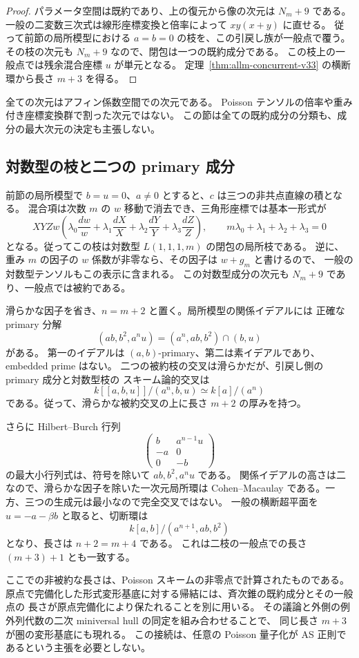 \begin{proof}
パラメータ空間は既約であり、上の復元から像の次元は $N_m+9$ である。
一般の二変数三次式は線形座標変換と倍率によって $xy(x+y)$ に直せる。
従って前節の局所模型における $a=b=0$ の枝を、この引戻し族が一般点で覆う。
その枝の次元も $N_m+9$ なので、閉包は一つの既約成分である。
この枝上の一般点では残余混合座標 $u$ が単元となる。
定理~\ref{thm:allm-concurrent-v33} の横断環から長さ $m+3$ を得る。
\end{proof}

全ての次元はアフィン係数空間での次元である。
Poisson テンソルの倍率や重み付き座標変換群で割った次元ではない。
この節は全ての既約成分の分類も、成分の最大次元の決定も主張しない。

\subsection{対数型の枝と二つの primary 成分}

前節の局所模型で $b=u=0$、$a\ne0$ とすると、$c$ は三つの非共点直線の積となる。
混合項は次数 $m$ の $w$ 移動で消去でき、三角形座標では基本一形式が
\[
 XYZ w\left(\lambda_0\frac{dw}{w}
 +\lambda_1\frac{dX}{X}
 +\lambda_2\frac{dY}{Y}
 +\lambda_3\frac{dZ}{Z}\right),
 \qquad m\lambda_0+\lambda_1+\lambda_2+\lambda_3=0
\]
となる。従ってこの枝は対数型 $L(1,1,1,m)$ の閉包の局所枝である。
逆に、重み $m$ の因子の $w$ 係数が非零なら、その因子は $w+g_m$ と書けるので、
一般の対数型テンソルもこの表示に含まれる。
この対数型成分の次元も $N_m+9$ であり、一般点では被約である。

滑らかな因子を省き、$n=m+2$ と置く。局所模型の関係イデアルには
正確な primary 分解
\[
 (ab,b^2,a^n u)=(a^n,ab,b^2)\cap(b,u)
\]
がある。
第一のイデアルは $(a,b)$-primary、第二は素イデアルであり、embedded prime はない。
二つの被約枝の交叉は滑らかだが、引戻し側の primary 成分と対数型枝の
スキーム論的交叉は
\[
 k[[a,b,u]]/(a^n,b,u)\simeq k[a]/(a^n)
\]
である。従って、滑らかな被約交叉の上に長さ $m+2$ の厚みを持つ。

さらに Hilbert--Burch 行列
\[
 \begin{pmatrix}
 b&a^{n-1}u\\
 -a&0\\
 0&-b
 \end{pmatrix}
\]
の最大小行列式は、符号を除いて $ab,b^2,a^nu$ である。
関係イデアルの高さは二なので、滑らかな因子を除いた一次元局所環は
Cohen--Macaulay である。一方、三つの生成元は最小なので完全交叉ではない。
一般の横断超平面を $u=-a-\beta b$ と取ると、切断環は
\[
 k[a,b]/(a^{n+1},ab,b^2)
\]
となり、長さは $n+2=m+4$ である。
これは二枝の一般点での長さ $(m+3)+1$ とも一致する。

\begin{remark}[原点の形式変形問題との接続]
ここでの非被約な長さは、Poisson スキームの非零点で計算されたものである。
原点で完備化した形式変形基底に対する帰結には、斉次錐の既約成分とその一般点の
長さが原点完備化により保たれることを別に用いる。
その議論と外側の例外列代数の二次 miniversal hull の同定を組み合わせることで、
同じ長さ $m+3$ が圏の変形基底にも現れる。
この接続は、任意の Poisson 量子化が AS 正則であるという主張を必要としない。
\end{remark}
